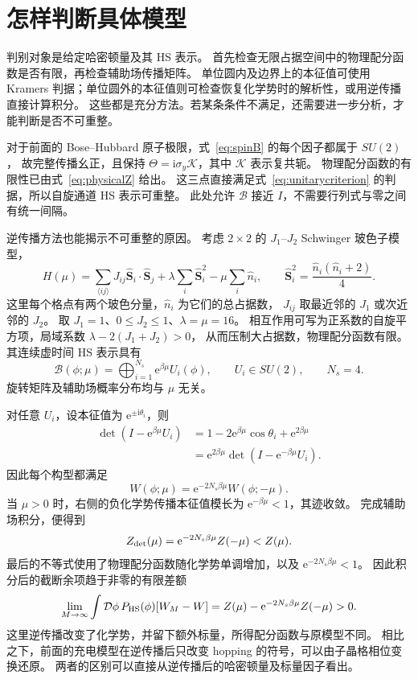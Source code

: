 \documentclass[UTF8,11pt,a4paper,fontset=fandol]{ctexart}
\newcommand{\ee}{\mathrm e}
\newcommand{\ii}{\mathrm i}
\numberwithin{equation}{section}
\begin{document}
\section{怎样判断具体模型}

判别对象是给定哈密顿量及其 HS 表示。
首先检查无限占据空间中的物理配分函数是否有限，再检查辅助场传播矩阵。
单位圆内及边界上的本征值可使用 Kramers 判据；单位圆外的本征值则可检查恢复化学势时的解析性，或用逆传播直接计算积分。
这些都是充分方法。若某条条件不满足，还需要进一步分析，才能判断是否不可重整。

对于前面的 Bose--Hubbard 原子极限，式~\eqref{eq:spinB} 的每个因子都属于 $SU(2)$，
故完整传播幺正，且保持 $\Theta=\ii\sigma_y\mathcal K$，其中 $\mathcal K$ 表示复共轭。
物理配分函数的有限性已由式~\eqref{eq:physicalZ} 给出。
这三点直接满足式~\eqref{eq:unitarycriterion} 的判据，所以自旋通道 HS 表示可重整。
此处允许 $\mathcal B$ 接近 $I$，不需要行列式与零之间有统一间隔。

逆传播方法也能揭示不可重整的原因。
考虑 $2\times2$ 的 $J_1$--$J_2$ Schwinger 玻色子模型，
\begin{equation}
 H(\mu)=\sum_{\langle ij\rangle}J_{ij}\hat{\boldsymbol S}_i\cdot\hat{\boldsymbol S}_j
       +\lambda\sum_i\hat{\boldsymbol S}_i^2-\mu\sum_i\hat n_i,
 \qquad \hat{\boldsymbol S}_i^2=\frac{\hat n_i(\hat n_i+2)}4.
\end{equation}
这里每个格点有两个玻色分量，$\hat n_i$ 为它们的总占据数，
$J_{ij}$ 取最近邻的 $J_1$ 或次近邻的 $J_2$。
取 $J_1=1$、$0\le J_2\le1$、$\lambda=\mu=16$。
相互作用可写为正系数的自旋平方项，局域系数 $\lambda-2(J_1+J_2)>0$，
从而压制大占据数，物理配分函数有限。
其连续虚时间 HS 表示具有
\begin{equation}
 \mathcal B(\phi;\mu)=\bigoplus_{i=1}^{N_s}\ee^{\beta\mu}U_i(\phi),
 \qquad U_i\in SU(2),\qquad N_s=4.
 \label{eq:rotationmodel}
\end{equation}
旋转矩阵及辅助场概率分布均与 $\mu$ 无关。

对任意 $U_i$，设本征值为 $\ee^{\pm\ii\theta_i}$，则
\begin{align}
 \det(I-\ee^{\beta\mu}U_i)
 &=1-2\ee^{\beta\mu}\cos\theta_i+\ee^{2\beta\mu}\nonumber\\
 &=\ee^{2\beta\mu}\det(I-\ee^{-\beta\mu}U_i).
\end{align}
因此每个构型都满足
\begin{equation}
 W(\phi;\mu)=\ee^{-2N_s\beta\mu}W(\phi;-\mu).
\end{equation}
当 $\mu>0$ 时，右侧的负化学势传播本征值模长为 $\ee^{-\beta\mu}<1$，其迹收敛。
完成辅助场积分，便得到
\begin{equation}
 Z_{\rm det}(\mu)=\ee^{-2N_s\beta\mu}Z(-\mu)<Z(\mu).
 \label{eq:rotationfailure}
\end{equation}
最后的不等式使用了物理配分函数随化学势单调增加，以及 $\ee^{-2N_s\beta\mu}<1$。
因此积分后的截断余项趋于非零的有限差额
\begin{equation}
 \lim_{M\to\infty}\int\mathcal D\phi\,P_{\rm HS}(\phi)[W_M-W]
 =Z(\mu)-\ee^{-2N_s\beta\mu}Z(-\mu)>0.
\end{equation}
这里逆传播改变了化学势，并留下额外标量，所得配分函数与原模型不同。
相比之下，前面的充电模型在逆传播后只改变 hopping 的符号，可以由子晶格相位变换还原。
两者的区别可以直接从逆传播后的哈密顿量及标量因子看出。
\end{document}
